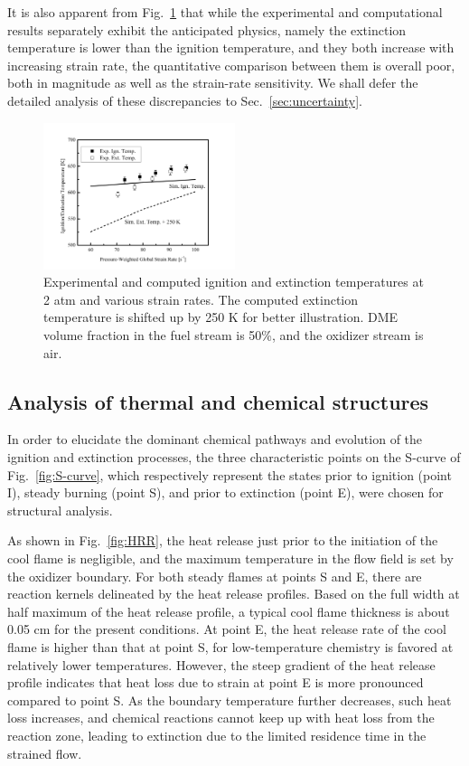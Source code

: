 \documentclass[review,3p,times]{elsarticle}
\begin{document}
It is also apparent from Fig.~\ref{fig:cmp_demo} that while the experimental and computational results separately exhibit the anticipated physics, namely the extinction temperature is lower than the ignition temperature, and they both increase with increasing strain rate, the quantitative comparison between them is overall poor, both in magnitude as well as the strain-rate sensitivity. We shall defer the detailed analysis of these discrepancies to Sec.~\ref{sec:uncertainty}. 

\begin{figure}[t]
  \centering
  \scriptsize
  \includegraphics[trim=6.5mm 7.5mm 7mm 8mm, clip=true, width=0.5\textwidth]{cmp_demo.png}
  \normalsize
  \caption{Experimental and computed ignition and extinction temperatures at 2 atm and various strain rates.  The computed extinction temperature is shifted up by 250 K for better illustration.  DME volume fraction in the fuel stream is 50\%, and the oxidizer stream is air.}
  \label{fig:cmp_demo}
\end{figure}

\subsection{Analysis of thermal and chemical structures}\label{sec:structure}

In order to elucidate the dominant chemical pathways and evolution of the ignition and extinction processes, the three characteristic points on the S-curve of Fig.~\ref{fig:S-curve}, which respectively represent the states prior to ignition (point I), steady burning (point S), and prior to extinction (point E), were chosen for structural analysis.

As shown in Fig.~\ref{fig:HRR}, the heat release just prior to the initiation of the cool flame is negligible, and the maximum temperature in the flow field is set by the oxidizer boundary.  For both steady flames at points S and E, there are reaction kernels delineated by the heat release profiles.  Based on the full width at half maximum of the heat release profile, a typical cool flame thickness is about 0.05 cm for the present conditions.  At point E, the heat release rate of the cool flame is higher than that at point S, for low-temperature chemistry is favored at relatively lower temperatures.  However, the steep gradient of the heat release profile indicates that heat loss due to strain at point E is more pronounced compared to point S.  As the boundary temperature further decreases, such heat loss increases, and chemical reactions cannot keep up with heat loss from the reaction zone, leading to extinction due to the limited residence time in the strained flow.
\end{document}
